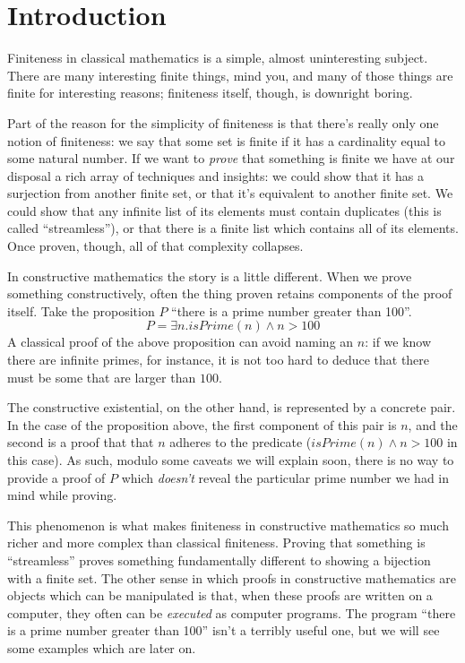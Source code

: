 \chapter{Introduction}
Finiteness in classical mathematics is a simple, almost uninteresting subject.
There are many interesting finite things, mind you, and many of those things are
finite for interesting reasons; finiteness itself, though, is downright boring.

Part of the reason for the simplicity of finiteness is that there's really only
one notion of finiteness: we say that some set is finite if it has a cardinality
equal to some natural number.
If we want to \emph{prove} that something is finite we have at our disposal a
rich array of techniques and insights: we could show that it has a surjection
from another finite set, or that it's equivalent to another finite set.
We could show that any infinite list of its elements must contain duplicates
(this is called ``streamless''), or that there is a finite list which contains
all of its elements.
Once proven, though, all of that complexity collapses.

In constructive mathematics the story is a little different.
When we prove something constructively, often the thing proven retains
components of the proof itself.
Take the proposition \(P\) ``there is a prime number greater than 100''.
\begin{equation}
  P = \exists n. \mathit{isPrime}(n) \wedge n > 100
\end{equation}
A classical proof of the above proposition can avoid naming an \(n\): if we know
there are infinite primes, for instance, it is not too hard to deduce that there
must be some that are larger than \(100\).

The constructive existential, on the other hand, is represented by a concrete
pair.
In the case of the proposition above, the first component of this pair is \(n\),
and the second is a proof that that \(n\) adheres to the predicate
(\(\mathit{isPrime}(n) \wedge n > 100\) in this case).
As such, modulo some caveats we will explain soon, there is no way to provide a
proof of \(P\) which \emph{doesn't} reveal the particular prime number we had in
mind while proving.

This phenomenon is what makes finiteness in constructive mathematics so much
richer and more complex than classical finiteness.
Proving that something is ``streamless'' proves something fundamentally
different to showing a bijection with a finite set.
The other sense in which proofs in constructive mathematics are objects which
can be manipulated is that, when these proofs are written on a computer, they
often can be \emph{executed} as computer programs.
The program ``there is a prime number greater than 100'' isn't a terribly useful
one, but we will see some examples which are later on.

